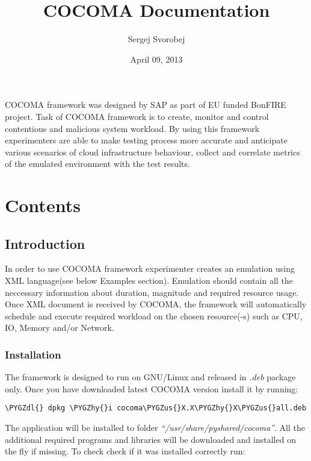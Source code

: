 \documentclass[letterpaper,10pt,english]{sphinxmanual}
\title{COCOMA Documentation}
\date{April 09, 2013}
\author{Sergej Svorobej}
\def\PYGZus{\char`\_}
\def\PYGZdl{\char`\$}
\def\PYGZhy{\char`\-}
\begin{document}
\maketitle
\tableofcontents
{}\label{index::doc}


COCOMA framework was designed by SAP as part of EU funded BonFIRE project. Task of COCOMA framework is
to create, monitor and control contentious and malicious system workload. By using
this framework experimenters are able to make testing process more accurate
and anticipate various scenarios of cloud infrastructure behaviour, collect and
correlate metrics of the emulated environment with the test results.


\chapter{Contents}
\label{index:controlled-contentious-and-malicious-cocoma-framework-1-0}\label{index:contents}

\section{Introduction}
\label{01_how_to_use_it:introduction}\label{01_how_to_use_it::doc}
In order to use COCOMA framework experimenter creates an emulation using XML language(see below Examples section). Emulation should contain all the neccessary information
about duration, magnitude and required resource usage. Once XML document is received by COCOMA, the framework will automatically schedule and execute
required workload on the chosen resource(-s) such as CPU, IO, Memory and/or Network.


\subsection{Installation}
\label{01_how_to_use_it:installation}
The framework is designed to run on GNU/Linux and released in \emph{.deb} package only.
Once you have downloaded latest COCOMA version install it by running:

\begin{Verbatim}[commandchars=\\\{\}]
\PYGZdl{} dpkg \PYGZhy{}i cocoma\PYGZus{}X.X\PYGZhy{}X\PYGZus{}all.deb
\end{Verbatim}

The application will be installed to folder \emph{``/usr/share/pyshared/cocoma''}. All the additional required programs and libraries will be downloaded and installed on the fly if missing.
To check check if it was installed correctly run:
\end{document}
